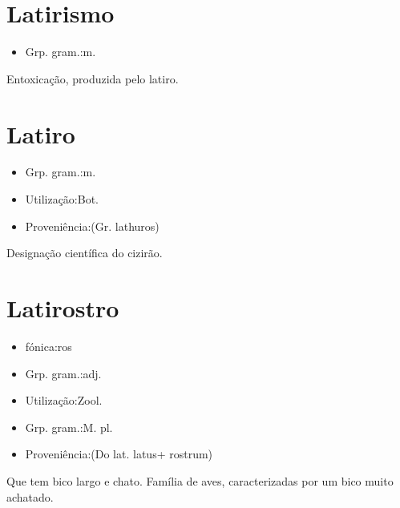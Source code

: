 \section{Latirismo}
\begin{itemize}
\item {Grp. gram.:m.}
\end{itemize}
Entoxicação, produzida pelo latiro.
\section{Latiro}
\begin{itemize}
\item {Grp. gram.:m.}
\end{itemize}
\begin{itemize}
\item {Utilização:Bot.}
\end{itemize}
\begin{itemize}
\item {Proveniência:(Gr. \textunderscore lathuros\textunderscore )}
\end{itemize}
Designação científica do cizirão.
\section{Latirostro}
\begin{itemize}
\item {fónica:ros}
\end{itemize}
\begin{itemize}
\item {Grp. gram.:adj.}
\end{itemize}
\begin{itemize}
\item {Utilização:Zool.}
\end{itemize}
\begin{itemize}
\item {Grp. gram.:M. pl.}
\end{itemize}
\begin{itemize}
\item {Proveniência:(Do lat. \textunderscore latus\textunderscore  + \textunderscore rostrum\textunderscore )}
\end{itemize}
Que tem bico largo e chato.
Família de aves, caracterizadas por um bico muito achatado.
